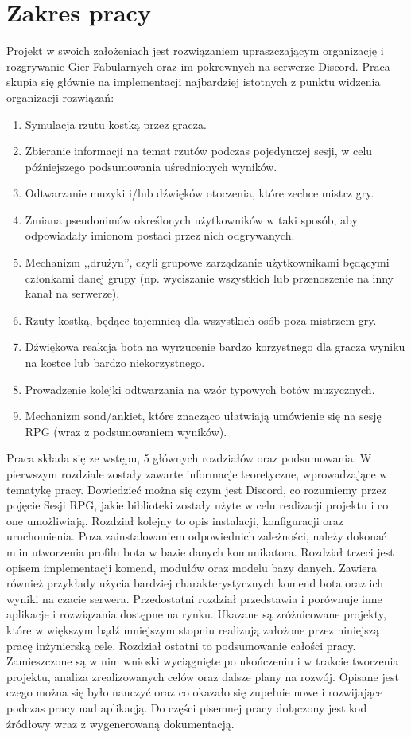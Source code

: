 \documentclass[shortabstract,inz]{iithesis}
\begin{document}
		\section*{Zakres pracy}
		Projekt w swoich założeniach jest rozwiązaniem upraszczającym organizację i rozgrywanie Gier Fabularnych oraz im pokrewnych na serwerze Discord. Praca skupia się głównie na implementacji najbardziej istotnych z punktu widzenia organizacji rozwiązań: \label{thesisgoals}
		\begin{enumerate}
			\item Symulacja rzutu kostką przez gracza.
			\item Zbieranie informacji na temat rzutów podczas pojedynczej sesji, w celu późniejszego podsumowania uśrednionych wyników.
			\item Odtwarzanie muzyki i/lub dźwięków otoczenia, które zechce mistrz gry.
			\item Zmiana pseudonimów określonych użytkowników w taki sposób, aby odpowiadały imionom postaci przez nich odgrywanych.
			\item Mechanizm ,,drużyn'', czyli grupowe zarządzanie użytkownikami będącymi członkami danej grupy (np. wyciszanie wszystkich lub przenoszenie na inny kanał na serwerze).
			\item Rzuty kostką, będące tajemnicą dla wszystkich osób poza mistrzem gry.
			\item Dźwiękowa reakcja bota na wyrzucenie bardzo korzystnego dla gracza wyniku na kostce lub bardzo niekorzystnego.
			\item Prowadzenie kolejki odtwarzania na wzór typowych botów muzycznych.
			\item Mechanizm sond/ankiet, które znacząco ułatwiają umówienie się na sesję RPG (wraz z podsumowaniem wyników).
		\end{enumerate}
	
		Praca składa się ze wstępu, 5 głównych rozdziałów oraz podsumowania. W pierwszym rozdziale zostały zawarte informacje teoretyczne, wprowadzające w tematykę pracy. Dowiedzieć można się czym jest Discord, co rozumiemy przez pojęcie Sesji RPG, jakie biblioteki zostały użyte w celu realizacji projektu i co one umożliwiają. Rozdział kolejny to opis instalacji, konfiguracji oraz uruchomienia. Poza zainstalowaniem odpowiednich zależności, należy dokonać m.in utworzenia profilu bota w bazie danych komunikatora. Rozdział trzeci jest opisem implementacji komend, modułów oraz modelu bazy danych. Zawiera również przykłady użycia bardziej charakterystycznych komend bota oraz ich wyniki na czacie serwera. Przedostatni rozdział przedstawia i porównuje inne aplikacje i rozwiązania dostępne na rynku. Ukazane są zróżnicowane projekty, które w większym bądź mniejszym stopniu realizują założone przez niniejszą pracę inżynierską cele. Rozdział ostatni to podsumowanie całości pracy. Zamieszczone są w nim wnioski wyciągnięte po ukończeniu i w trakcie tworzenia projektu, analiza zrealizowanych celów oraz dalsze plany na rozwój. Opisane jest czego można się było nauczyć oraz co okazało się zupełnie nowe i rozwijające podczas pracy nad aplikacją. Do części pisemnej pracy dołączony jest kod źródłowy wraz z wygenerowaną dokumentacją.
		
\end{document}
